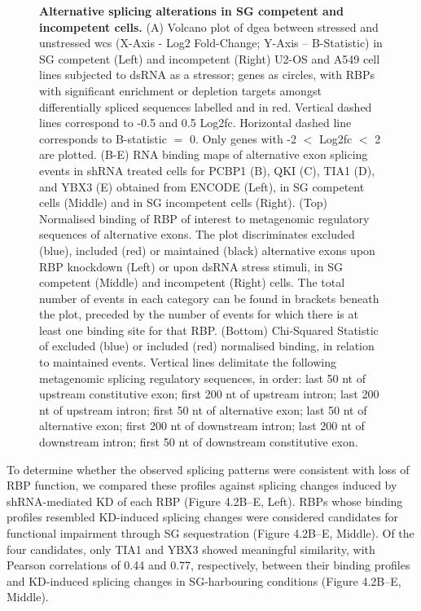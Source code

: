 \begin{figure}[t]
	\captionsetup{labelformat=adja-page}
	\ContinuedFloat
	\caption[]{\textbf{Alternative splicing alterations in SG competent and incompetent cells.} (A) Volcano plot of \gls{dgea} between stressed and unstressed \glspl{wc} (X-Axis -  Log2 Fold-Change; Y-Axis – B-Statistic) in SG competent (Left) and incompetent (Right) U2-OS and A549 cell lines subjected to dsRNA as a stressor\cite{paget_stress_2023}; genes as circles, with RBPs with significant enrichment or depletion targets amongst differentially spliced sequences labelled and in red. Vertical dashed lines correspond to -0.5 and 0.5 Log2\gls{fc}. Horizontal dashed line corresponds to B-statistic $=$ 0. Only genes with -2 $<$ Log2\gls{fc} $<$ 2 are plotted. (B-E) RNA binding maps of alternative exon splicing events in shRNA treated cells for PCBP1 (B), QKI (C), TIA1 (D), and YBX3 (E) obtained from ENCODE\cite{the_encode_project_consortium_integrated_2012} (Left), in SG competent cells (Middle) and in SG incompetent cells (Right). (Top) Normalised binding of RBP of interest to metagenomic regulatory sequences of alternative exons. The plot discriminates excluded (blue), included (red) or maintained (black) alternative exons upon RBP knockdown (Left) or upon dsRNA stress stimuli, in SG competent (Middle) and incompetent (Right) cells. The total number of events in each category can be found in brackets beneath the plot, preceded by the number of events for which there is at least one binding site for that RBP. (Bottom) Chi-Squared Statistic of excluded (blue) or included (red) normalised binding, in relation to maintained events. Vertical lines delimitate the following metagenomic splicing regulatory sequences, in order: last 50 nt of upstream constitutive exon; first 200 nt of upstream intron; last 200 nt of upstream intron; first 50 nt of alternative exon; last 50 nt of alternative exon; first 200 nt of downstream intron; last 200 nt of downstream intron; first 50 nt of downstream constitutive exon.}
\end{figure}
\noindent
To determine whether the observed splicing patterns were consistent with loss of RBP function, we compared these profiles against splicing changes induced by shRNA-mediated KD of each RBP (Figure 4.2B–E, Left). RBPs whose binding profiles resembled KD-induced splicing changes were considered candidates for functional impairment through SG sequestration (Figure 4.2B–E, Middle). Of the four candidates, only TIA1 and YBX3 showed meaningful similarity, with Pearson correlations of 0.44 and 0.77, respectively, between their binding profiles and KD-induced splicing changes in SG-harbouring conditions (Figure 4.2B–E, Middle).
